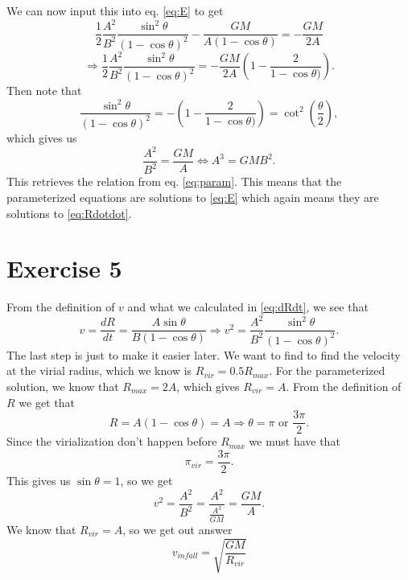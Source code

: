 \documentclass[a4paper,norsk, 10pt]{article}
\begin{document}
We can now input this into eq. \eqref{eq:E} to get
\begin{equation}
\frac{1}{2}\frac{A^2}{B^2}\frac{\sin^2 \theta}{(1-\cos \theta)^2} - \frac{GM}{A(1-\cos \theta)} = -\frac{GM}{2A}
\end{equation}
\begin{equation}
\Rightarrow \frac{1}{2}\frac{A^2}{B^2}\frac{\sin^2 \theta}{(1-\cos \theta)^2} = -\frac{GM}{2A}\left(1 - \frac{2}{1-\cos \theta)}\right).
\end{equation}
Then note that
\begin{equation}
\frac{\sin^2 \theta}{(1-\cos \theta)^2} = - \left(1 - \frac{2}{1-\cos \theta)}\right) = \cot^2\left(\frac{\theta}{2}\right),
\end{equation}
which gives us
\begin{equation}
\frac{A^2}{B^2} = \frac{GM}{A} \Leftrightarrow A^3 = GMB^2.
\end{equation}
This retrieves the relation from eq. \eqref{eq:param}. This means that the parameterized equations are solutions to \eqref{eq:E} which again means they are solutions to \eqref{eq:Rdotdot}.

\section{Exercise 5}
From the definition of $v$ and what we calculated in \eqref{eq:dRdt}, we see that
\begin{equation}
v = \frac{dR}{dt} = \frac{A\sin\theta}{B(1-\cos \theta)} \Rightarrow v^2 = \frac{A^2}{B^2}\frac{\sin^2 \theta}{(1-\cos \theta)^2}.
\end{equation}
The last step is just to make it easier later. We want to find to find the velocity at the virial radius, which we know is $R_{vir} = 0.5R_{max}$. For the parameterized solution, we know that $R_{max} = 2A$, which gives $R_{vir} = A$. From the definition of $R$ we get that
\begin{equation}
R = A(1-\cos \theta) = A \Rightarrow \theta = \pi \text{ or } \frac{3\pi}{2}. 
\end{equation}
Since the virialization don't happen before $R_{max}$ we must have that
\begin{equation}
\pi_{vir} = \frac{3\pi}{2}.
\end{equation}
This gives us $\sin \theta = 1$, so we get
\begin{equation}
v^2 = \frac{A^2}{B^2} = \frac{A^2}{\frac{A^3}{GM}} = \frac{GM}{A}.
\end{equation}
We know that $R_{vir} = A$, so we get out answer
\begin{equation}
v_{infall} = \sqrt{\frac{GM}{R_{vir}}}
\end{equation}
\end{document}
